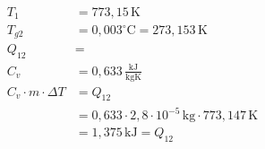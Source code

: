 

\item[c)] 
    \begin{align*}
        T_1 &= 773,15 \, \text{K} \\
        T_{g2} &= 0,003^\circ \text{C} = 273,153 \, \text{K} \\
        Q_{12} &= \\
        C_v &= 0,633 \, \frac{\text{kJ}}{\text{kgK}} \\
        C_v \cdot m \cdot \Delta T &= Q_{12} \\
        &= 0,633 \cdot 2,8 \cdot 10^{-5} \, \text{kg} \cdot 773,147 \, \text{K} \\
        &= 1,375 \, \text{kJ} = Q_{12}
    \end{align*}